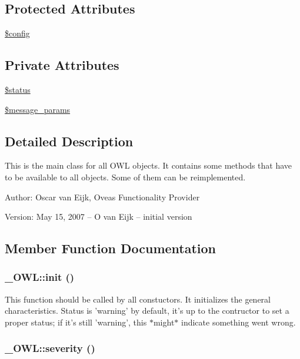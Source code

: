 \subsection*{Protected Attributes}
\begin{CompactItemize}
\item 
\hyperlink{class__OWL_f37a011667dda12fc417a68a6f3077d1}{\$config}
\end{CompactItemize}
\subsection*{Private Attributes}
\begin{CompactItemize}
\item 
\hyperlink{class__OWL_af448f6bc8a90e20c09e9e2b8fe46eb5}{\$status}
\item 
\hyperlink{class__OWL_9cd573fffbb55aa42f29d83b39308528}{\$message\_\-params}
\end{CompactItemize}


\subsection{Detailed Description}
This is the main class for all OWL objects. It contains some methods that have to be available to all objects. Some of them can be reimplemented. \begin{Desc}
\item[Author:]Oscar van Eijk, Oveas Functionality Provider \end{Desc}
\begin{Desc}
\item[Version:]May 15, 2007 -- O van Eijk -- initial version \end{Desc}


\subsection{Member Function Documentation}
\hypertarget{class__OWL_e0ef3ded56e8a6b34b6461e5a721cd3e}{
\subsubsection{\setlength{\rightskip}{0pt plus 5cm}\_\-OWL::init ()}}
\label{class__OWL_e0ef3ded56e8a6b34b6461e5a721cd3e}


This function should be called by all constuctors. It initializes the general characteristics. Status is 'warning' by default, it's up to the contructor to set a proper status; if it's still 'warning', this $\ast$might$\ast$ indicate something went wrong. \hypertarget{class__OWL_5b88d497ccf2305fa411b9bd3f4bfe6f}{
\subsubsection{\setlength{\rightskip}{0pt plus 5cm}\_\-OWL::severity ()}}
\label{class__OWL_5b88d497ccf2305fa411b9bd3f4bfe6f}


